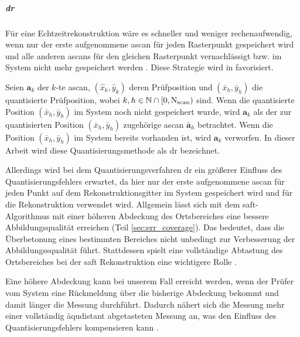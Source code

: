 \subparagraph*{\gls{dr}}
Für eine Echtzeitrekonstruktion wäre es schneller und weniger rechenaufwendig, wenn nur der erste aufgenommene \gls{ascan} für jeden Rasterpunkt gespeichert wird und alle anderen \glspl{ascan} für den gleichen Rasterpunkt vernachlässigt bzw. im System nicht mehr gespeichert werden \cite{Krieg18SAFTwithSmartInspect}. Diese Strategie wird in \cite{Krieg18SAFTwithSmartInspect} favorisiert. \par
Seien $\bm{a}_k$ der $k$-te \gls{ascan}, $(\hat{x}_k, \hat{y}_k)$ deren Prüfposition und $(\bar{x}_h, \bar{y}_h)$ die quantisierte Prüfposition, wobei $k, h \in {\mathbb{N}} \cap [0, \operatorname{N}_{\operatorname{scan}})$ sind. Wenn die quantisierte Position $(\bar{x}_h, \bar{y}_h)$ im System noch nicht gespeichert wurde, wird $\bm{a}_k$ als der zur quantisierten Position $(\bar{x}_h, \bar{y}_h)$ zugehörige \gls{ascan} $\bar{\bm{a}}_h$ betrachtet. Wenn die Position $(\bar{x}_h, \bar{y}_h)$ im System bereits vorhanden ist, wird $\bm{a}_k$ verworfen. In dieser Arbeit wird diese Quantisierungsmethode als \gls{dr} bezeichnet.\par
Allerdings wird bei dem Quantisierungsverfahren \gls{dr} ein größerer Einfluss des Quantisierungsfehlers erwartet, da hier nur der erste aufgenommene \gls{ascan} für jeden Punkt auf dem Rekonstruktionsgitter im System gespeichert wird und für die Rekonstruktion verwendet wird. Allgemein lässt sich mit dem \acrshort{saft}-Algorithmus mit einer höheren Abdeckung des Ortsbereiches eine bessere Abbildungsqualität erreichen (Teil \ref{sec:err_coverage}). Das bedeutet, dass die Überbetonung eines bestimmten Bereiches nicht unbedingt zur Verbesserung der Abbildungssqualität führt. Stattdessen spielt eine vollständige Abtastung des Ortsbereiches bei der \acrshort{saft} Rekonstruktion eine wichtigere Rolle \cite{Krieg18SAFTwithSmartInspect}. \par
Eine höhere Abdeckung kann bei unserem Fall erreicht werden, wenn der Prüfer vom System eine Rückmeldung über die bisherige Abdeckung bekommt und damit länger die Messung durchführt. Dadurch nähert sich die Messung mehr einer vollständig äqudistant abgetasteten Messung an, was den Einfluss des Quantisierungsfehlers kompensieren kann \cite{Krieg18SAFTwithSmartInspect}.


